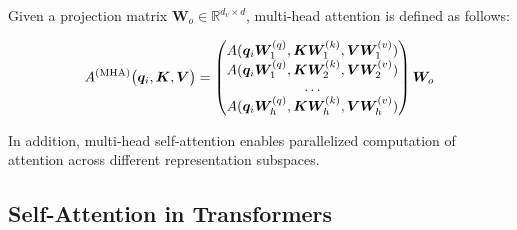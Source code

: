 

Given a projection matrix $\bm{W}_o \in \mathbb{R}^{d_v \times d}$, multi-head attention is defined as follows:


\begin{equation}
    A^{\textrm{(MHA)}}\bigl(\bm{q}_i, \bm{K}, \bm{V}\bigr) = 
    \begin{pmatrix}
        A(\bm{q}_i \bm{W}^{(q)}_1, \bm{K}\bm{W}^{(k)}_1, \bm{V}\bm{W}^{(v)}_1) \\
        A(\bm{q}_i \bm{W}^{(q)}_1, \bm{K}\bm{W}^{(k)}_2, \bm{V}\bm{W}^{(v)}_2) \\
        \ldots \\
        A(\bm{q}_i \bm{W}^{(q)}_h, \bm{K}\bm{W}^{(k)}_h, \bm{V}\bm{W}^{(v)}_h)
    \end{pmatrix}
    \bm{W}_o \\
\end{equation}
    

\noindent In addition, multi-head self-attention enables parallelized computation of attention across different representation subspaces.

 
\subsection{Self-Attention in Transformers}

